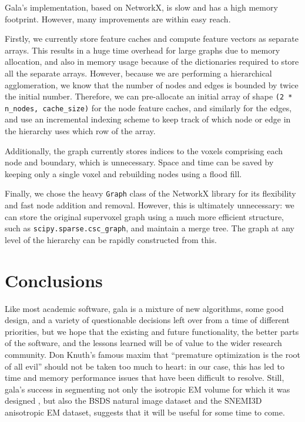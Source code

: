 \documentclass{frontiersSCNS} %
\begin{document}
Gala's implementation, based on NetworkX, is slow and has a high memory footprint.
However, many improvements are within easy reach.

Firstly, we currently store feature caches and compute feature vectors as separate arrays.
This results in a huge time overhead for large graphs due to memory allocation, and also in memory usage because of the dictionaries required to store all the separate arrays.
However, because we are performing a hierarchical agglomeration, we know that the number of nodes and edges is bounded by twice the initial number.
Therefore, we can pre-allocate an initial array of shape \texttt{\small (2 * n\_nodes, cache\_size)} for the node feature caches, and similarly for the edges, and use an incremental indexing scheme to keep track of which node or edge in the hierarchy uses which row of the array.

Additionally, the graph currently stores indices to the voxels comprising each node and boundary, which is unnecessary.
Space and time can be saved by keeping only a single voxel and rebuilding nodes using a flood fill.

Finally, we chose the heavy \texttt{\small Graph} class of the NetworkX library for its flexibility and fast node addition and removal.
However, this is ultimately unnecessary: we can store the original supervoxel graph using a much more efficient structure, such as \texttt{\small scipy.sparse.csc\_graph}, and maintain a merge tree.
The graph at any level of the hierarchy can be rapidly constructed from this.

\section{Conclusions}

Like most academic software, gala is a mixture of new algorithms, some good design, and a variety of questionable decisions left over from a time of different priorities, but we hope that the existing and future functionality, the better parts of the software, and the lessons learned will be of value to the wider research community.
Don Knuth's famous maxim that ``premature optimization is the root of all evil'' \citep{knuth74opt} should not be taken too much to heart: in our case, this has led to time and memory performance issues that have been difficult to resolve.
Still, gala's success in segmenting not only the isotropic EM volume for which it was designed \citep{Glasner:2011uk, NunezIglesias:2013cd}, but also the BSDS natural image dataset and the SNEMI3D anisotropic EM dataset, suggests that it will be useful for some time to come.
\end{document}
